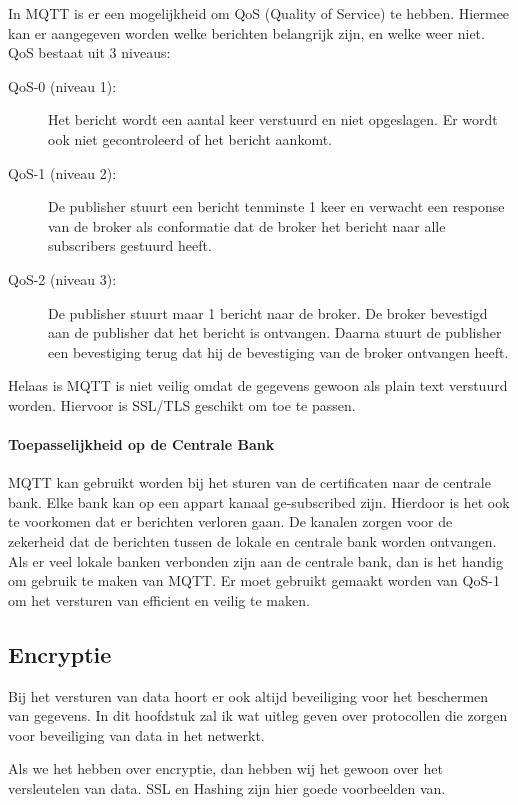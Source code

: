 \documentclass{article}
\begin{document}
In MQTT is er een mogelijkheid om QoS (Quality of Service) te hebben.
Hiermee kan er aangegeven worden welke berichten belangrijk zijn,
en welke weer niet.
QoS bestaat uit 3 niveaus:
\begin{description}
	\item [QoS-0 (niveau 1):] Het bericht wordt een aantal keer verstuurd en niet opgeslagen.
		Er wordt ook niet gecontroleerd of het bericht aankomt.
	\item [QoS-1 (niveau 2):] De publisher stuurt een bericht tenminste 1 keer en verwacht
		een response van de broker als conformatie dat de broker het bericht naar alle
		subscribers gestuurd heeft.
	\item [QoS-2 (niveau 3):] De publisher stuurt maar 1 bericht naar de broker. De broker
		bevestigd aan de publisher dat het bericht is ontvangen.
		Daarna stuurt de publisher een bevestiging terug dat hij de bevestiging van de broker
		ontvangen heeft. 
\end{description}
Helaas is MQTT is niet veilig omdat de gegevens gewoon als plain text verstuurd worden.
Hiervoor is SSL/TLS geschikt om toe te passen.

\paragraph{Toepasselijkheid op de Centrale Bank}
MQTT kan gebruikt worden bij het sturen van de certificaten naar de centrale bank.
Elke bank kan op een appart kanaal ge-subscribed zijn.
Hierdoor is het ook te voorkomen dat er berichten verloren gaan.
De kanalen zorgen voor de zekerheid dat de berichten tussen de lokale en centrale bank
worden ontvangen.
Als er veel lokale banken verbonden zijn aan de centrale bank,
dan is het handig om gebruik te maken van MQTT.
Er moet gebruikt gemaakt worden van QoS-1 om het versturen van efficient en veilig te maken.

\clearpage
\newpage

\subsection{Encryptie}
Bij het versturen van data hoort er ook altijd beveiliging
voor het beschermen van gegevens.
In dit hoofdstuk zal ik wat uitleg geven over
protocollen die zorgen voor beveiliging van data in het netwerkt.

Als we het hebben over encryptie,
dan hebben wij het gewoon over het versleutelen van data.
SSL en Hashing zijn hier goede voorbeelden van.
\end{document}

